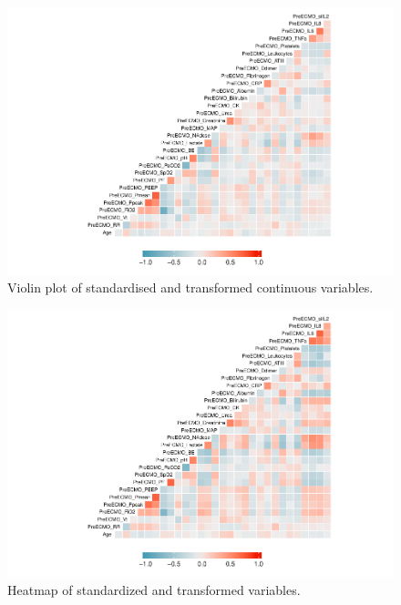 \documentclass[12pt,]{article}
\begin{document}
\begin{figure}[H]

{\centering \includegraphics[width=1\linewidth]{figure/graphics-unnamed-chunk-10-1} 

}

\caption{\label{fig:violin-transformed}Violin plot of standardised and transformed continuous variables.}\label{fig:unnamed-chunk-10}
\end{figure}

\begin{figure}[H]

{\centering \includegraphics[width=1\linewidth]{figure/graphics-unnamed-chunk-11-1} 

}

\caption{\label{fig:heatmap-standardized}Heatmap of standardized and transformed variables.}\label{fig:unnamed-chunk-11}
\end{figure}
\end{document}
